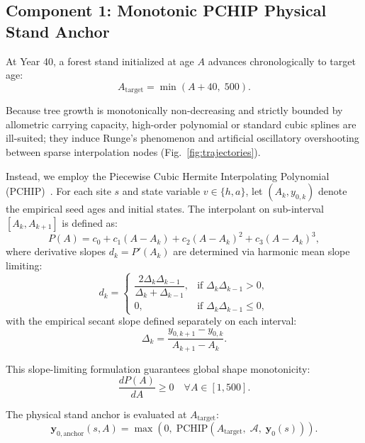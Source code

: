 \documentclass[conference]{IEEEtran}
\begin{document}
\subsection{Component 1: Monotonic PCHIP Physical Stand Anchor}
At Year 40, a forest stand initialized at age $A$ advances chronologically to target age:
\begin{equation}
    A_{\text{target}} = \min(A + 40, \; 500).
\end{equation}

Because tree growth is monotonically non-decreasing and strictly bounded by allometric carrying capacity, high-order polynomial or standard cubic splines are ill-suited; they induce Runge's phenomenon and artificial oscillatory overshooting between sparse interpolation nodes (Fig.~\ref{fig:trajectories}).

Instead, we employ the Piecewise Cubic Hermite Interpolating Polynomial (PCHIP)~\cite{fritsch1980monotone}. For each site $s$ and state variable $v \in \{h, a\}$, let $(A_k, y_{0,k})$ denote the empirical seed ages and initial states. The interpolant on sub-interval $[A_k, A_{k+1}]$ is defined as:
\begin{equation}
    P(A) = c_0 + c_1 (A - A_k) + c_2 (A - A_k)^2 + c_3 (A - A_k)^3,
\end{equation}
where derivative slopes $d_k = P'(A_k)$ are determined via harmonic mean slope limiting:
\begin{equation}
    d_k = \begin{cases}
    \dfrac{2 \Delta_k \Delta_{k-1}}{\Delta_k + \Delta_{k-1}}, & \text{if } \Delta_k \Delta_{k-1} > 0, \\[6pt]
    0, & \text{if } \Delta_k \Delta_{k-1} \le 0,
    \end{cases}
    \label{eq:pchip_slopes}
\end{equation}
with the empirical secant slope defined separately on each interval:
\begin{equation}
    \Delta_k = \frac{y_{0,k+1} - y_{0,k}}{A_{k+1} - A_k}.
    \label{eq:secant_slope}
\end{equation}

This slope-limiting formulation guarantees global shape monotonicity:
\begin{equation}
    \frac{d P(A)}{dA} \ge 0 \quad \forall A \in [1, 500].
\end{equation}

The physical stand anchor is evaluated at $A_{\text{target}}$:
\begin{equation}
    \mathbf{y}_{0,\text{anchor}}(s, A) = \max\left(0, \; \text{PCHIP}\left(A_{\text{target}}, \; \mathcal{A}, \; \mathbf{y}_0(s)\right)\right).
    \label{eq:pchip}
\end{equation}
\end{document}
